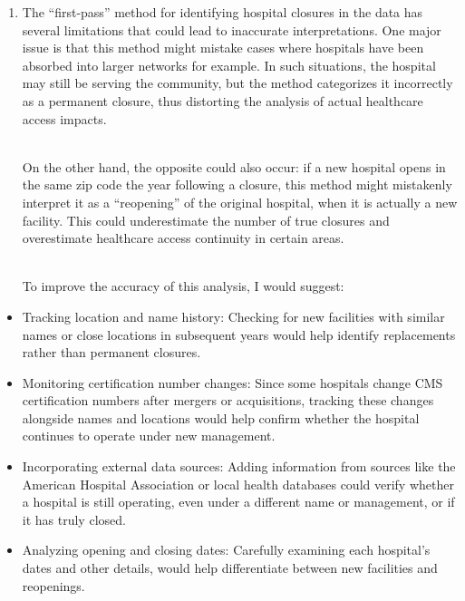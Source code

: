 \documentclass[
  letterpaper,
  DIV=11,
  numbers=noendperiod]{scrartcl}
\providecommand{\tightlist}{%
  \setlength{\itemsep}{0pt}\setlength{\parskip}{0pt}}\usepackage{longtable,booktabs,array}
\begin{document}
\begin{enumerate}
\def\labelenumi{\arabic{enumi}.}
\tightlist
\item
  The ``first-pass'' method for identifying hospital closures in the
  data has several limitations that could lead to inaccurate
  interpretations. One major issue is that this method might mistake
  cases where hospitals have been absorbed into larger networks for
  example. In such situations, the hospital may still be serving the
  community, but the method categorizes it incorrectly as a permanent
  closure, thus distorting the analysis of actual healthcare access
  impacts.\\
  \strut \\
  On the other hand, the opposite could also occur: if a new hospital
  opens in the same zip code the year following a closure, this method
  might mistakenly interpret it as a ``reopening'' of the original
  hospital, when it is actually a new facility. This could underestimate
  the number of true closures and overestimate healthcare access
  continuity in certain areas.\\
  \strut \\
  To improve the accuracy of this analysis, I would suggest:\\
\end{enumerate}

\begin{itemize}
\tightlist
\item
  Tracking location and name history: Checking for new facilities with
  similar names or close locations in subsequent years would help
  identify replacements rather than permanent closures.
\item
  Monitoring certification number changes: Since some hospitals change
  CMS certification numbers after mergers or acquisitions, tracking
  these changes alongside names and locations would help confirm whether
  the hospital continues to operate under new management.
\item
  Incorporating external data sources: Adding information from sources
  like the American Hospital Association or local health databases could
  verify whether a hospital is still operating, even under a different
  name or management, or if it has truly closed.
\item
  Analyzing opening and closing dates: Carefully examining each
  hospital's dates and other details, would help differentiate between
  new facilities and reopenings.
\end{itemize}
\end{document}
